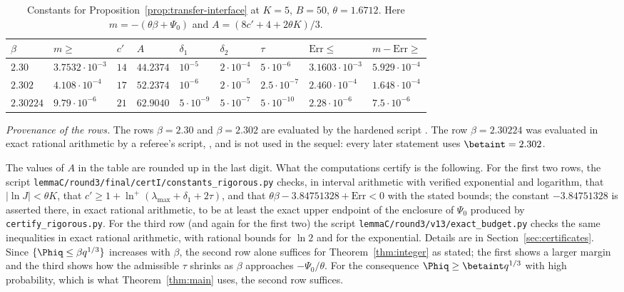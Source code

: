 \begin{table}[ht]
\caption{Constants for Proposition~\ref{prop:transfer-interface} at $K=5$, $B=50$,
$\theta=1.6712$. Here $m=-(\theta\beta+\Psi_0)$ and $A=(8c'+4+2\theta K)/3$.}\label{tab:transfer-constants}
{\footnotesize\setlength{\tabcolsep}{2.5pt}
\begin{tabular}{@{}lllllllll@{}}
\toprule
$\beta$ & $m\ge$ & $c'$ & $A$ & $\delta_1$ & $\delta_2$ & $\tau$ & $\mathrm{Err}\le$ & $m-\mathrm{Err}\ge$ \\
\midrule
$2.30$ & $3.7532\cdot10^{-3}$ & $14$ & $44.2374$ & $10^{-5}$ & $2\cdot10^{-4}$ & $5\cdot10^{-6}$ & $3.1603\cdot10^{-3}$ & $5.929\cdot10^{-4}$ \\
$2.302$ & $4.108\cdot10^{-4}$ & $17$ & $52.2374$ & $10^{-6}$ & $2\cdot10^{-5}$ & $2.5\cdot10^{-7}$ & $2.460\cdot10^{-4}$ & $1.648\cdot10^{-4}$ \\
$2.30224$ & $9.79\cdot10^{-6}$ & $21$ & $62.9040$ & $5\cdot10^{-9}$ & $5\cdot10^{-7}$ & $5\cdot10^{-10}$ & $2.28\cdot10^{-6}$ & $7.5\cdot10^{-6}$ \\
\bottomrule
\end{tabular}}
\end{table}

\emph{Provenance of the rows.} The rows $\beta=2.30$ and $\beta=2.302$ are evaluated by the
hardened script . The row
$\beta=2.30224$ was evaluated in exact rational arithmetic by a referee's script,
, and is not used in the sequel: every later
statement uses $\betaint=2.302$.


The values of $A$ in the table are rounded up in the last digit. What the computations
certify is the following. For the first two rows, the script
\texttt{lemmaC/\allowbreak round3/\allowbreak final/\allowbreak certI/\allowbreak constants\_rigorous.py} checks, in interval arithmetic with
verified exponential and logarithm, that $|\ln J|<\theta K$, that
$c'\ge1+\ln^+(\lambda_{\max}+\delta_1+2\tau)$, and that
$\theta\beta-3.84751328+\mathrm{Err}<0$ with the stated bounds; the constant $-3.84751328$ is
asserted there, in exact rational arithmetic, to be at least the exact upper endpoint of the
enclosure of $\Psi_0$ produced by \texttt{certify\_rigorous.py}. For the third row (and again
for the first two) the script
\texttt{lemmaC/\allowbreak round3/\allowbreak v13/\allowbreak exact\_budget.py} checks the same
inequalities in exact rational arithmetic, with rational bounds for $\ln2$ and for the
exponential. Details are in Section~\ref{sec:certificates}. Since
$\{\Phiq\le\beta q^{1/3}\}$ increases with $\beta$, the second row alone suffices for
Theorem~\ref{thm:integer} as stated; the first shows a larger margin and the third shows how the admissible $\tau$ shrinks as $\beta$
approaches $-\Psi_0/\theta$. For the consequence $\Phiq\ge\betaint q^{1/3}$ with high
probability, which is what Theorem~\ref{thm:main} uses, the second row suffices.

